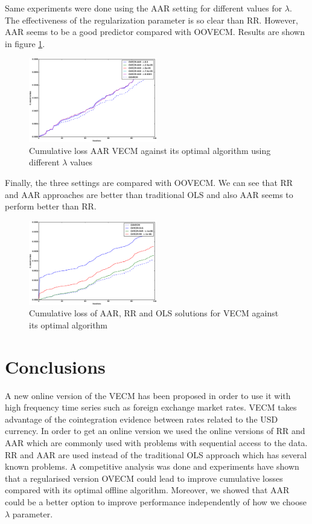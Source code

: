 \documentclass[twocolumn]{svjour3}          %
\begin{document}
Same experiments were done using the AAR setting for different values for $\lambda$. The effectiveness of the regularization parameter is so clear than RR. However, AAR seems to be a good predictor compared with OOVECM. Results are shown in figure \ref{fig:AARcomparison}.

\begin{figure}[!ht]
  \centering
  \includegraphics[width=0.5\textwidth]{AARcomparison}
  \caption{Cumulative loss AAR VECM against its optimal algorithm using different $\lambda$ values}
  \label{fig:AARcomparison}
\end{figure}

Finally, the three settings are compared with OOVECM. We can see that RR and AAR approaches are better than traditional OLS and also AAR seems to perform better than RR.

\begin{figure}[!ht]
  \centering
  \includegraphics[width=0.5\textwidth]{onlinecomparison}
  \caption{Cumulative loss of AAR, RR and OLS solutions for VECM against its optimal algorithm}
  \label{fig:onlinecomparison}
\end{figure}


\section{Conclusions}
\label{sec:conclusions}

A new online version of the VECM has been proposed in order to use it with high frequency time series such as foreign exchange market rates. VECM takes advantage of the cointegration evidence between rates related to the USD currency. In order to get an online version we used the online versions of RR and AAR which are commonly used with problems with sequential access to the data. RR and AAR are used instead of the traditional OLS approach which has several known problems. A competitive analysis was done and experiments have shown that a regularised version OVECM could lead to improve cumulative losses compared with its optimal offline algorithm. Moreover, we showed that AAR could be a better option to improve performance independently of  how we choose $\lambda$ parameter. 


\end{document}
